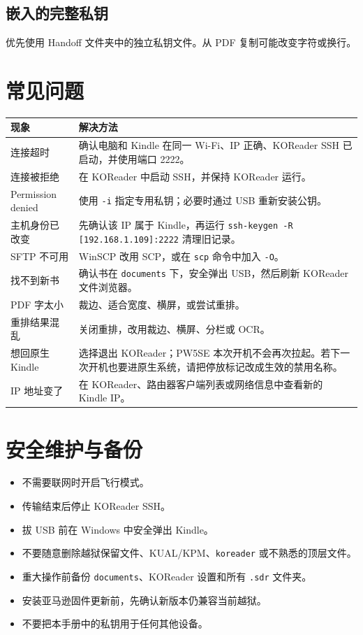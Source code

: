 \documentclass[10pt,a4paper]{article}
\begin{document}
\subsection{嵌入的完整私钥}

优先使用 Handoff 文件夹中的独立私钥文件。从 PDF 复制可能改变字符或换行。


\section{常见问题}

\begin{longtable}{@{}p{}p{}@{}}
\toprule
\textbf{现象} & \textbf{解决方法} \\
\midrule
连接超时 & 确认电脑和 Kindle 在同一 Wi-Fi、IP 正确、KOReader SSH 已启动，并使用端口 2222。 \\
连接被拒绝 & 在 KOReader 中启动 SSH，并保持 KOReader 运行。 \\
Permission denied & 使用 \texttt{-i} 指定专用私钥；必要时通过 USB 重新安装公钥。 \\
主机身份已改变 & 先确认该 IP 属于 Kindle，再运行 \texttt{ssh-keygen -R [192.168.1.109]:2222} 清理旧记录。 \\
SFTP 不可用 & WinSCP 改用 SCP，或在 \texttt{scp} 命令中加入 \texttt{-O}。 \\
找不到新书 & 确认书在 \texttt{documents} 下，安全弹出 USB，然后刷新 KOReader 文件浏览器。 \\
PDF 字太小 & 裁边、适合宽度、横屏，或尝试重排。 \\
重排结果混乱 & 关闭重排，改用裁边、横屏、分栏或 OCR。 \\
想回原生 Kindle & 选择退出 KOReader；PW5SE 本次开机不会再次拉起。若下一次开机也要进原生系统，请把停放标记改成生效的禁用名称。 \\
IP 地址变了 & 在 KOReader、路由器客户端列表或网络信息中查看新的 Kindle IP。 \\
\bottomrule
\end{longtable}

\section{安全维护与备份}

\begin{itemize}
  \item 不需要联网时开启飞行模式。
  \item 传输结束后停止 KOReader SSH。
  \item 拔 USB 前在 Windows 中安全弹出 Kindle。
  \item 不要随意删除越狱保留文件、KUAL/KPM、\texttt{koreader} 或不熟悉的顶层文件。
  \item 重大操作前备份 \texttt{documents}、KOReader 设置和所有 \texttt{.sdr} 文件夹。
  \item 安装亚马逊固件更新前，先确认新版本仍兼容当前越狱。
  \item 不要把本手册中的私钥用于任何其他设备。
\end{itemize}
\end{document}
